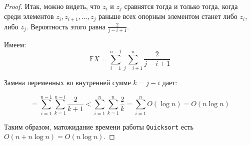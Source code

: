 \begin{proof}
    Итак, можно видеть, что $z_i$ и $z_j$ сравнятся тогда и только тогда, когда среди элементов $z_i, z_{i+1}, \ldots, z_j$ раньше всех опорным элементом станет либо $z_i$, либо $z_j$. Вероятность этого равна $\frac{2}{j-i+1}$.
    
    Имеем: $$\mathbb E X = \sum_{i=1}^{n-1} \sum_{j=i+1}^n \frac{2}{j-i+1}$$
    
    Замена переменных во внутренней сумме $k = j-i$ дает:
    
    $$ = \sum_{i=1}^{n-1} \sum_{k=1}^{n-i} \frac{2}{k+1} < \sum_{i=1}^n \sum_{k=1}^n \frac{2}{k} = \sum_{i=1}^n O(\log n) = O(n \log n)$$
    
    Таким образом, матожидание времени работы \texttt{Quicksort} есть $O(n+n\log n) = O(n\log n)$. 
\end{proof}
